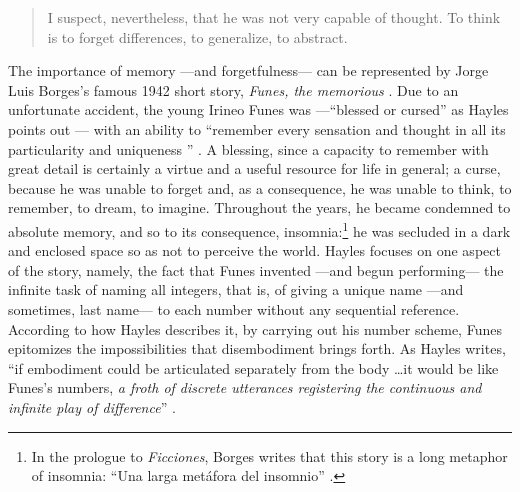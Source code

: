
% 

\begin{quote}
	I suspect, nevertheless, that he was not very capable of thought. To think is to forget differences, to generalize, to abstract. \parencite[2]{Bor42:Fun}
\end{quote} %

The importance of memory ---and forgetfulness--- can be represented by Jorge Luis Borges's famous 1942 short story, \textit{Funes, the memorious} \parencite{Bor42:Fun}. Due to an unfortunate accident, the young Irineo Funes was ---``blessed or cursed'' as Hayles points out \parencite[156]{Hay93:The}--- with an ability to ``remember every sensation and thought in all its particularity and uniqueness '' \parencite{Hay93:The}. A blessing, since a capacity to remember with great detail is certainly a virtue and a useful resource for life in general; a curse, because he was unable to forget and, as a consequence, he was unable to think, to remember, to dream, to imagine. Throughout the years, he became condemned to absolute memory, and so to its consequence, insomnia:\footnote{In the prologue to \textit{Ficciones}, Borges writes that this story is a long metaphor of insomnia: ``Una larga metáfora del insomnio'' \parencite{Ovi19:Mem}.} he was secluded in a dark and enclosed space so as not to perceive the world. Hayles focuses on one aspect of the story, namely, the fact that Funes invented ---and begun performing--- the infinite task of naming all integers, that is, of giving a unique name ---and sometimes, last name--- to each number without any sequential reference. According to how Hayles describes it, by carrying out his number scheme, Funes epitomizes the impossibilities that disembodiment brings forth. As Hayles writes, ``if embodiment could be articulated separately from the body \dots it would be like Funes's numbers, \textit{a froth of discrete utterances registering the continuous and infinite play of difference}'' \im \parencite[156-159]{Hay93:The}.


